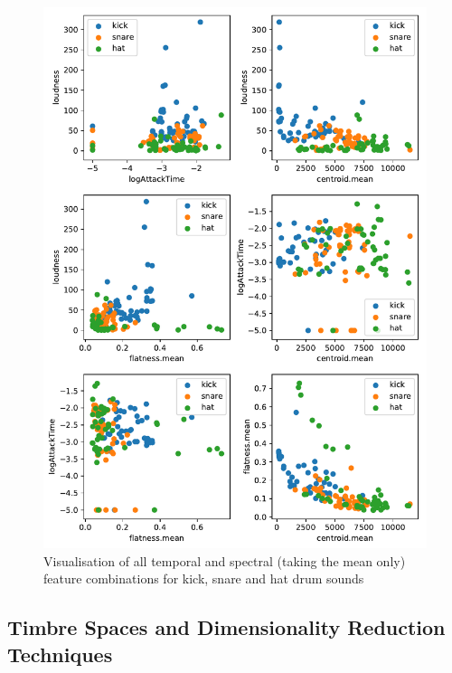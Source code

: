 \begin{figure}
	\begin{center}
		\includegraphics[width=1.0\textwidth]{ch06_rhythmcat/figures/feature_axis_combos.pdf}
	\end{center}
	\caption[Visualisation of all temporal and spectral feature combinations for kick, snare and hat drum sounds]{Visualisation of all temporal and spectral (taking the mean only) feature combinations for kick, snare and hat drum sounds}
	\label{fig:temporal_and_spectral_features}
\end{figure}

\subsection{Timbre Spaces and Dimensionality Reduction Techniques}

